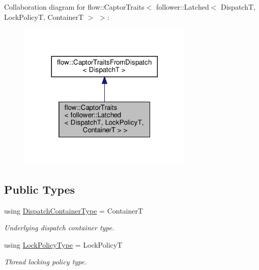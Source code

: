 Collaboration diagram for flow\+:\+:Captor\+Traits$<$ follower\+:\+:Latched$<$ DispatchT, Lock\+PolicyT, ContainerT $>$ $>$\+:
\nopagebreak
\begin{figure}[H]
\begin{center}
\leavevmode
\includegraphics[width=236pt]{structflow_1_1_captor_traits_3_01follower_1_1_latched_3_01_dispatch_t_00_01_lock_policy_t_00_01_b52b96650456e7f978c8f411027cfb59}
\end{center}
\end{figure}
\subsection*{Public Types}
\begin{DoxyCompactItemize}
\item 
\mbox{\label{structflow_1_1_captor_traits_3_01follower_1_1_latched_3_01_dispatch_t_00_01_lock_policy_t_00_01_container_t_01_4_01_4_a683e18639ce41cdde597fb0f07f985e7}} 
using \hyperlink{structflow_1_1_captor_traits_3_01follower_1_1_latched_3_01_dispatch_t_00_01_lock_policy_t_00_01_container_t_01_4_01_4_a683e18639ce41cdde597fb0f07f985e7}{Dispatch\+Container\+Type} = ContainerT
\begin{DoxyCompactList}\small\item\em Underlying dispatch container type. \end{DoxyCompactList}\item 
\mbox{\label{structflow_1_1_captor_traits_3_01follower_1_1_latched_3_01_dispatch_t_00_01_lock_policy_t_00_01_container_t_01_4_01_4_acd12c9dc520003a589583f88a04e92ed}} 
using \hyperlink{structflow_1_1_captor_traits_3_01follower_1_1_latched_3_01_dispatch_t_00_01_lock_policy_t_00_01_container_t_01_4_01_4_acd12c9dc520003a589583f88a04e92ed}{Lock\+Policy\+Type} = Lock\+PolicyT
\begin{DoxyCompactList}\small\item\em Thread locking policy type. \end{DoxyCompactList}\end{DoxyCompactItemize}


